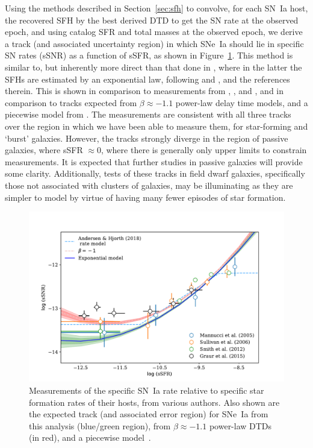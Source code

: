 \documentclass[apj, linenumbers]{aastex62}
\begin{document}
Using the methods described in Section~\ref{sec:sfh} to convolve, for each SN~Ia host, the recovered SFH by the best derived DTD to get the SN rate at the observed epoch, and using catalog SFR and total masses at the observed epoch, we derive a track (and associated uncertainty region) in which SNe~Ia should lie in specific SN rates (sSNR) as a function of sSFR, as shown in Figure~\ref{fig:ssfr}. This method is similar to, but inherently more direct than that done in \cite{Graur:2015fk}, where in the latter the SFHs are estimated by an exponential law, following \cite{Gallazzi:2005rf} and
\cite{Kauffmann:2003sj}, and the references therein. This is shown in comparison to measurements from \cite{Mannucci:2005}, \cite{Sullivan:2006a}, and \cite{Smith:2012lr}, and in comparison to tracks expected from $\beta\approx-1.1$ power-law delay time models, and a piecewise model from \cite{Andersen:2018dp}. The measurements are consistent with all three tracks over the region in which we have been able to measure them, for star-forming and `burst' galaxies. However, the tracks strongly diverge in the region of passive galaxies, where sSFR $\approx0$, where there is generally only upper limits to constrain measurements. It is expected that further studies in passive galaxies will provide some clarity. Additionally, tests of these tracks in field dwarf galaxies, specifically those not associated with clusters of galaxies, may be illuminating as they are simpler to model by virtue of having many fewer episodes of star formation. 

\begin{figure}[t]
   \centering
   \includegraphics[width=6.1in]{figure_ssfr.pdf}
   \caption{\footnotesize Measurements of the specific SN~Ia rate relative to specific star formation rates of their hosts, from various authors. Also shown are the expected track (and associated error region) for SNe~Ia from this analysis (blue/green region), from $\beta\approx-1.1$ power-law DTDs (in red), and a piecewise model~\cite[][ blue-dashed line]{Andersen:2018dp}.}
   \label{fig:ssfr}
\end{figure}
\end{document}
